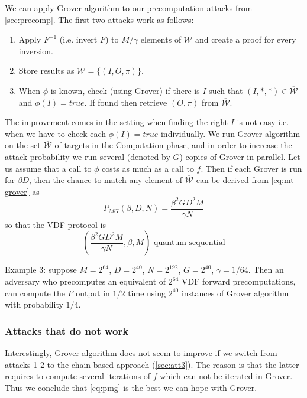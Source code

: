 We can apply Grover algorithm to our precomputation attacks from \cref{sec:precomp}. 
The first two attacks work as follows:
\begin{enumerate}
    \item Apply $F^{-1}$ (i.e. invert $F$) to  $M/\gamma$ elements of  $\mathcal{W}$  and create a proof for every inversion.
    \item Store results as $\overline{\mathcal{W}}=\{(I,O,\pi)\}$.
    \item When $\phi$ is known, check (using Grover) if there is $I$ such that  $(I,*,*)\in\overline{\mathcal{W}}$ and $\phi(I)=true$. If found then retrieve $(O,\pi)$ from $\overline{\mathcal{W}}$.
\end{enumerate}
The improvement comes in the setting when finding the right $I$ is not easy i.e. when we have to check each $\phi(I)=true$ individually. We run Grover algorithm on the set $\overline{\mathcal{W}}$ of targets in the Computation phase, and in order to increase the attack probability we run several (denoted by $G$) copies of Grover in parallel. Let us assume that a call to $\phi$ costs as much as a call to $f$. Then if each Grover is run for $\beta D$, then the chance to match any element of   $\overline{\mathcal{W}}$ can be derived from \eqref{eq:mt-grover} as 
\begin{equation}\label{eq:pmg}
    P_{MG}(\beta, D,N) = \frac{\beta^2 G D^2M}{\gamma N}
\end{equation}
so that the VDF protocol is
$$
\left(\frac{\beta^2 G D^2M}{\gamma N},\beta,M\right)\text{-quantum-sequential}
$$

Example 3: suppose   $M=2^{64}$, $D=2^{40}$, $N=2^{192}$, $G=2^{40}$, $\gamma=1/64$. Then an adversary who precomputes an  equivalent of $2^{64}$ VDF forward precomputations, can compute the $F$ output in  $1/2$ time using $2^{40}$ instances of Grover algorithm with probability $1/4$.




\subsubsection{Attacks that do not work}

Interestingly, Grover algorithm does not  seem  to improve if we switch from attacks 1-2 to   the chain-based approach (\cref{sec:att3}). The reason is that the   latter requires to compute several iterations of $f$ which can not be iterated in Grover. Thus we conclude that \eqref{eq:pmg} is the best we can hope with Grover.

